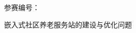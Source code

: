 \thispagestyle{empty}

\begin{center}
  \vspace*{4cm}
  { 参赛编号：\underline{\hspace{6cm}}}

  \vspace{3cm}
  {\heiti 嵌入式社区养老服务站的建设与优化问题}
\end{center}
